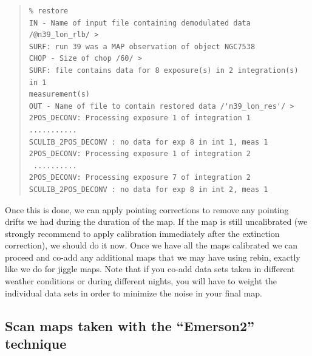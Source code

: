 \documentclass[twoside,11pt]{article}
\newenvironment{myquote}{\begin{quote}\begin{small}}{\end{small}\end{quote}}
\newcommand{\task}[1]{\textsf{#1}}
\newcommand{\rebin}{\xref{\task{rebin}}{sun216}{REBIN}}
\newcommand{\xref}[3]{#1}
\newcommand{\xlabel}[1]{}
\renewcommand{\_}{\texttt{\symbol{95}}}
\begin{document}
\begin{myquote}
\begin{verbatim}
% restore
IN - Name of input file containing demodulated data /@n39_lon_rlb/ >
SURF: run 39 was a MAP observation of object NGC7538
CHOP - Size of chop /60/ >
SURF: file contains data for 8 exposure(s) in 2 integration(s) in 1
measurement(s)
OUT - Name of file to contain restored data /'n39_lon_res'/ >
2POS_DECONV: Processing exposure 1 of integration 1
...........
SCULIB_2POS_DECONV : no data for exp 8 in int 1, meas 1
2POS_DECONV: Processing exposure 1 of integration 2
 ..........
2POS_DECONV: Processing exposure 7 of integration 2
SCULIB_2POS_DECONV : no data for exp 8 in int 2, meas 1
\end{verbatim}
\end{myquote}

Once this is done, we can apply pointing corrections to remove any
pointing drifts we had during the duration of the map.  If the map is
still uncalibrated (we strongly recommend to apply calibration
immediately after the extinction correction), we should do it now.
Once we have all the maps calibrated we can proceed and co-add any
additional maps that we may have using \rebin, exactly like we do for
jiggle maps.  Note that if you co-add data sets taken in different
weather conditions or during different nights, you will have to weight
the individual data sets in order to minimize the noise in your final
map.


\subsection{\xlabel{Emerson2_maps}Scan maps taken with the
``Emerson2''
technique}
\end{document}
